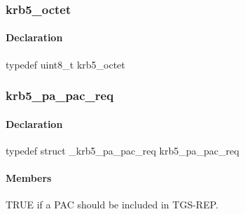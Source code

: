 \documentclass[letterpaper,10pt,english]{sphinxmanual}
\begin{document}
\subsubsection{krb5\_octet}
\label{appdev/refs/types/krb5_octet:krb5-octet-struct}\label{appdev/refs/types/krb5_octet:krb5-octet}\label{appdev/refs/types/krb5_octet::doc}

\begin{fulllineitems}
\label{appdev/refs/types/krb5_octet:c.krb5_octet}
\end{fulllineitems}



\paragraph{Declaration}
\label{appdev/refs/types/krb5_octet:declaration}
typedef uint8\_t krb5\_octet


\subsubsection{krb5\_pa\_pac\_req}
\label{appdev/refs/types/krb5_pa_pac_req:krb5-pa-pac-req-struct}\label{appdev/refs/types/krb5_pa_pac_req::doc}\label{appdev/refs/types/krb5_pa_pac_req:krb5-pa-pac-req}

\begin{fulllineitems}
\label{appdev/refs/types/krb5_pa_pac_req:c.krb5_pa_pac_req}
\end{fulllineitems}



\paragraph{Declaration}
\label{appdev/refs/types/krb5_pa_pac_req:declaration}
typedef struct \_krb5\_pa\_pac\_req  krb5\_pa\_pac\_req


\paragraph{Members}
\label{appdev/refs/types/krb5_pa_pac_req:members}

\begin{fulllineitems}
\label{appdev/refs/types/krb5_pa_pac_req:c.krb5_pa_pac_req.include_pac}
TRUE if a PAC should be included in TGS-REP.

\end{fulllineitems}
\end{document}
